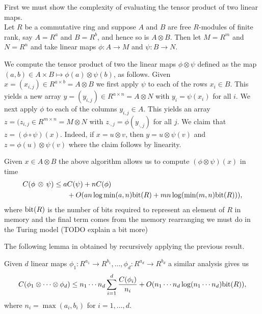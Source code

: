 First we must show the complexity of evaluating the tensor product of two linear maps.\\
Let $R$ be a commutative ring and suppose $A$ and $B$ are free $R$-modules of finite rank, say $A = R^a$ and $B = R^b$, and hence so is $A \otimes B$. Then let $M = R^m$ and $N = R^n$ and take linear maps $\phi: A \to M$ and $\psi : B \to N$.

We compute the tensor product of two the linear maps $\phi \otimes \psi$ defined as the map $(a, b) \in A\times B \mapsto \phi(a) \otimes \psi(b)$, as follows. Given $x = (x_{i,j}) \in R^{a \times b} = A \otimes B$ we first apply $\psi$ to each of the rows $x_i \in B$. This yields a new array $y = (y_{i, j}) \in R^{a \times n} = A \otimes N$ with $y_i = \psi(x_i)$ for all $i$. We next apply $\phi$ to each of the columns $y_{i, j} \in A$. This yields an array $z = (z_{i, j} \in R^{m \times n} = M \otimes N$ with $z_{\cdot , j} = \phi(y_{\cdot, j})$ for all $j$. We claim that $z = (\phi \circ \psi)(x)$. Indeed, if $x = u \otimes v$, then $y = u \otimes \psi(v)$ and $z = \phi(u) \otimes \psi(v)$ where the claim follows by linearity.

Given $x \in A \otimes B$ the above algorithm allows us to compute $(\phi \otimes \psi) (x)$ in time
\begin{align*}
    C(\phi \,\otimes\, \psi) \leq a&C(\psi) + nC(\phi)\\
                                   &+ O(a n \log \min(a, n) \textrm{bit}(R) + m n \log( \min (m, n)\textrm{bit}(R))),
\end{align*}
where $\textrm{bit}(R)$ is the number of bits required to represent an element of $R$ in memory and the final term comes from the memory rearranging we must do in the Turing model (TODO explain a bit more)

The following lemma in obtained by recursively applying the previous result.

\begin{lemma}\label{lem:multi-dim-dft}
    Given $d$ linear maps $\phi_1: R^{a_1} \to R^{b_1}, \ldots, \phi_d: R^{a_d} \to R^{b_d}$ a similar analysis gives us
    \[
        C(\phi_1 \otimes \cdots \otimes \phi_d) \leq n_1\cdots n_d \sum^d_{i = 1} \frac{C(\phi_i)}{n_i} + O(n_1\cdots n_d \log (n_1 \cdots n_d) \textrm{bit}(R)),
    \]
    where $n_i = \max(a_i, b_i)$ for $i = 1, \ldots, d$.
\end{lemma}



